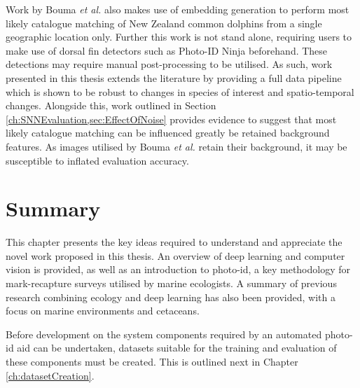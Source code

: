 Work by Bouma \textit{et al.} \cite{bouma_individual_2018} also makes use of embedding generation to perform most likely catalogue matching of New Zealand common dolphins from a single geographic location only. Further this work is not stand alone, requiring users to make use of dorsal fin detectors such as Photo-ID Ninja beforehand. These detections may require manual post-processing to be utilised. As such, work presented in this thesis extends the literature by providing a full data pipeline which is shown to be robust to changes in species of interest and spatio-temporal changes. Alongside this, work outlined in Section \ref{ch:SNNEvaluation,sec:EffectOfNoise} provides evidence to suggest that most likely catalogue matching can be influenced greatly be retained background features. As images utilised by Bouma \textit{et al.} retain their background, it may be susceptible to inflated evaluation accuracy. 

\section{Summary}\label{ch:Background,sec:Summary}

This chapter presents the key ideas required to understand and appreciate the novel work proposed in this thesis. An overview of deep learning and computer vision is provided, as well as an introduction to photo-id, a key methodology for mark-recapture surveys utilised by marine ecologists. A summary of previous research combining ecology and deep learning has also been provided, with a focus on marine environments and cetaceans. 

Before development on the system components required by an automated photo-id aid can be undertaken, datasets suitable for the training and evaluation of these components must be created. This is outlined next in Chapter \ref{ch:datasetCreation}.

